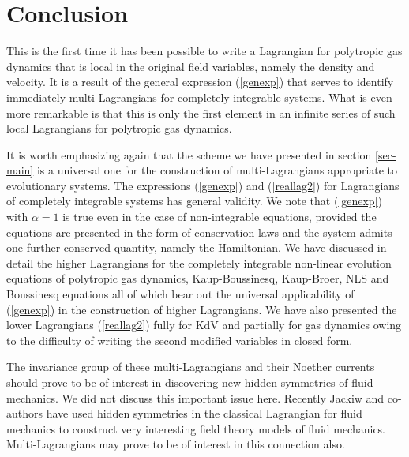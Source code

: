 \documentclass[a4paper,12pt]{article}
\begin{document}
\section{Conclusion}

This is the first time it has been possible to write a Lagrangian
for polytropic gas dynamics that is local in the original field
variables, namely the density and velocity. It is a result of the
general expression (\ref{genexp}) that serves to identify
immediately multi-Lagrangians for completely integrable systems.
What is even more remarkable is that this is only the first
element in an infinite series of such local Lagrangians for
polytropic gas dynamics.

It is worth emphasizing again that the scheme we have presented in
section \ref{sec-main} is a universal one for the construction of
multi-Lagrangians appropriate to evolutionary systems. The
expressions (\ref{genexp}) and (\ref{reallag2}) for Lagrangians of
completely integrable systems has general validity. We note that
(\ref{genexp}) with $\alpha=1$ is true even in the case of
non-integrable equations, provided the equations are presented in
the form of conservation laws and the system admits one further
conserved quantity, namely the Hamiltonian. We have discussed in
detail the higher Lagrangians for the completely integrable
non-linear evolution equations of polytropic gas dynamics,
Kaup-Boussinesq, Kaup-Broer, NLS and Boussinesq equations all of
which bear out the universal applicability of (\ref{genexp}) in
the construction of higher  Lagrangians. We have also presented
the lower Lagrangians (\ref{reallag2}) fully for KdV and partially
for gas dynamics owing to the difficulty of writing the second
modified variables in closed form.

The invariance group of these multi-Lagrangians and their Noether
currents should prove to be of interest in discovering new hidden
symmetries of fluid mechanics. We did not discuss this important
issue here. Recently Jackiw and co-authors \cite{jackiw} have used
hidden symmetries in the classical Lagrangian for fluid mechanics
to construct very interesting field theory models of fluid
mechanics. Multi-Lagrangians may prove to be of interest in this
connection also.
\end{document}

